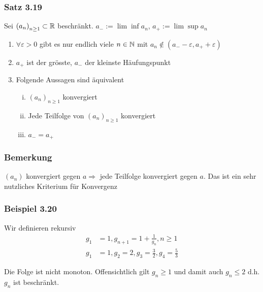 \subsubsection*{Satz 3.19}
Sei $\left( a_n\right)_{n\geq 1}\subset\mathbb{R}$ beschränkt. $a_{-}:=\lim\inf a_n$, $a_+:=\lim\sup a_n$
\begin{enumerate}
\item $\forall\varepsilon > 0$ gibt es nur endlich viele $n\in\mathbb{N}$ mit $a_n\not\in\left( a_- -\varepsilon,a_+ +\varepsilon\right)$
\item $a_+$ ist der grösste, $a_-$ der kleinste Häufungspunkt
\item Folgende Aussagen sind äquivalent
\begin{enumerate}[(i)]
\item $\left( a_n\right)_{n\geq 1}$ konvergiert
\item Jede Teilfolge von $\left( a_n\right)_{n\geq 1}$ konvergiert
\item $a_-=a_+$
\end{enumerate}
\end{enumerate}
\subsubsection*{Bemerkung}
$\left( a_n\right)$ konvergiert gegen $a\Rightarrow$ jede Teilfolge konvergiert gegen $a$. Das ist ein sehr nutzliches Kriterium für Konvergenz

\subsubsection*{Beispiel 3.20}
Wir definieren rekursiv
\begin{align*}
g_1&=1, g_{n+1}=1+\frac{1}{g_n}, n\geq 1\\
g_1&=1, g_2=2, g_3=\frac{3}{2}, g_4=\frac{5}{3}
\end{align*}
\begin{center}
\end{center}
Die Folge ist nicht monoton. Offensichtlich gilt $g_n\geq 1$ und damit auch $g_n\leq 2$ d.h. $g_n$ ist beschränkt.\\

